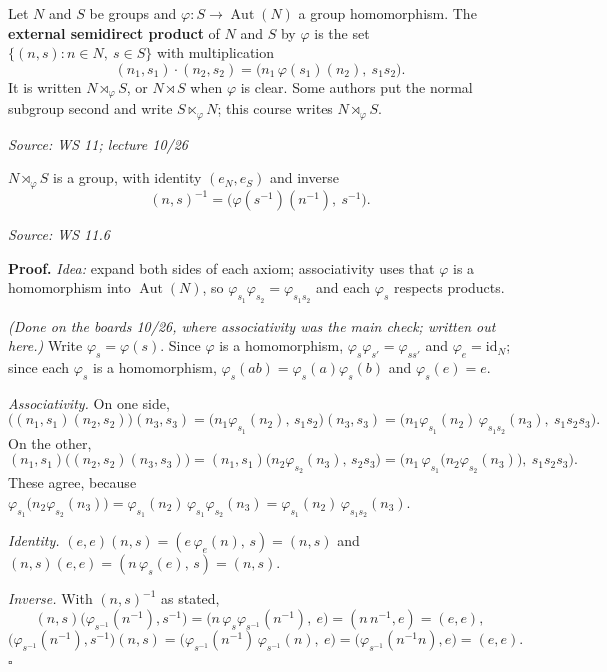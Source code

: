\documentclass[11pt]{report}
\renewenvironment{proof}[1][Proof]{\noindent\textbf{#1.} }{\hfill$\square$\par\vspace{5pt}}
\newcommand{\srcline}[1]{\par\hfill{\footnotesize\textit{Source: #1}}}
\begin{document}
\begin{defbox}\label{def:external-semidirect-product}
Let $N$ and $S$ be groups and $\varphi: S \to \operatorname{Aut}(N)$ a group homomorphism. The \textbf{external semidirect product} of $N$ and $S$ by $\varphi$ is the set $\{(n, s) : n \in N,\ s \in S\}$ with multiplication
\[ (n_1, s_1) \cdot (n_2, s_2) = \big(n_1\,\varphi(s_1)(n_2),\ s_1s_2\big). \]
It is written $N \rtimes_\varphi S$, or $N \rtimes S$ when $\varphi$ is clear. Some authors put the normal subgroup second and write $S \ltimes_\varphi N$; this course writes $N \rtimes_\varphi S$.
\srcline{WS 11; lecture 10/26}
\end{defbox}

\begin{thmbox}\label{thm:semidirect-group}
$N \rtimes_\varphi S$ is a group, with identity $(e_N, e_S)$ and inverse
\[ (n, s)^{-1} = \big(\varphi(s^{-1})(n^{-1}),\ s^{-1}\big). \]
\srcline{WS 11.6}
\end{thmbox}

\begin{proof}
\textit{Idea:} expand both sides of each axiom; associativity uses that $\varphi$ is a homomorphism into $\operatorname{Aut}(N)$, so $\varphi_{s_1}\varphi_{s_2} = \varphi_{s_1s_2}$ and each $\varphi_s$ respects products.\par
\textit{(Done on the boards 10/26, where associativity was the main check; written out here.)} Write $\varphi_s = \varphi(s)$. Since $\varphi$ is a homomorphism, $\varphi_{s}\varphi_{s'} = \varphi_{ss'}$ and $\varphi_{e} = \mathrm{id}_N$; since each $\varphi_s$ is a homomorphism, $\varphi_s(ab) = \varphi_s(a)\varphi_s(b)$ and $\varphi_s(e) = e$.

\emph{Associativity.} On one side,
\[ \big((n_1, s_1)(n_2, s_2)\big)(n_3, s_3) = \big(n_1\varphi_{s_1}(n_2),\, s_1s_2\big)(n_3, s_3) = \big(n_1\varphi_{s_1}(n_2)\,\varphi_{s_1s_2}(n_3),\ s_1s_2s_3\big). \]
On the other,
\[ (n_1, s_1)\big((n_2, s_2)(n_3, s_3)\big) = (n_1, s_1)\big(n_2\varphi_{s_2}(n_3),\, s_2s_3\big) = \big(n_1\,\varphi_{s_1}\!\big(n_2\varphi_{s_2}(n_3)\big),\ s_1s_2s_3\big). \]
These agree, because $\varphi_{s_1}\big(n_2\varphi_{s_2}(n_3)\big) = \varphi_{s_1}(n_2)\,\varphi_{s_1}\varphi_{s_2}(n_3) = \varphi_{s_1}(n_2)\,\varphi_{s_1s_2}(n_3)$.

\emph{Identity.} $(e, e)(n, s) = (e\,\varphi_e(n),\, s) = (n, s)$ and $(n, s)(e, e) = (n\,\varphi_s(e),\, s) = (n, s)$.

\emph{Inverse.} With $(n, s)^{-1}$ as stated,
\[ (n, s)\big(\varphi_{s^{-1}}(n^{-1}), s^{-1}\big) = \big(n\,\varphi_s\varphi_{s^{-1}}(n^{-1}),\ e\big) = (n\,n^{-1}, e) = (e, e), \]
\[ \big(\varphi_{s^{-1}}(n^{-1}), s^{-1}\big)(n, s) = \big(\varphi_{s^{-1}}(n^{-1})\,\varphi_{s^{-1}}(n),\ e\big) = \big(\varphi_{s^{-1}}(n^{-1}n), e\big) = (e, e). \]
\end{proof}
\end{document}
